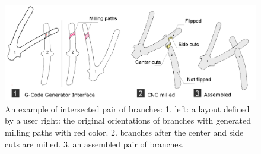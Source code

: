 \begin{figure}[H]
  \begin{center}
    \includegraphics[width = 0.4\paperwidth]{images/system/joint_milling_diagram_4.png}
    \caption{An example of intersected pair of branches: 1. left: a layout defined by a user right: the original orientations of branches with generated milling paths with red color. 2. branches after the center and side cuts are milled. 3. an assembled pair of branches. }
    \label{fig:joint_geometry}
  \end{center}
\end{figure}
